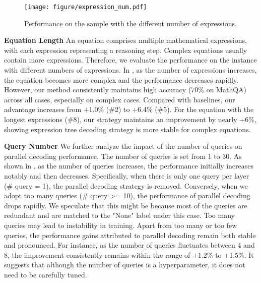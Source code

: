 \documentclass[11pt]{article}
\begin{document}
\begin{figure}[t] \centering \texttt{[image: figure/expression\_num.pdf]} \caption{Performance on the sample with the different number of expressions.} \label{expression_num} \end{figure}



\textbf{Equation Length} 
An equation comprises multiple mathematical expressions, with each expression representing a reasoning step. Complex equations usually contain more expressions. Therefore, we evaluate the performance on the instance with different numbers of expressions. In , as the number of expressions increases, the equation becomes more complex and the performance decreases rapidly. However, our method consistently maintains high accuracy (70\% on MathQA) across all cases, especially on complex cases. Compared with baselines, our advantage increases from +1.0\% (\#2) to +6.4\% (\#5). For the equation with the longest expressions (\#8), our strategy maintains an improvement by nearly +6\%, showing expression tree decoding strategy is more stable for complex equations.

\textbf{Query Number} 
We further analyze the impact of the number of queries on parallel decoding performance. The number of queries is set from 1 to 30. As shown in , as the number of queries increases, the performance initially increases notably and then decreases. Specifically, when there is only one query per layer (\# query = 1), the parallel decoding strategy is removed. Conversely, when we adopt too many queries (\# query >= 10), the performance of parallel decoding drops rapidly. We speculate that this might be because most of the queries are redundant and are matched to the "None" label under this case. Too many queries may lead to instability in training. Apart from too many or too few queries, the performance gains attributed to parallel decoding remain both stable and pronounced. For instance, as the number of queries fluctuates between 4 and 8, the improvement consistently remains within the range of +1.2\% to +1.5\%. It suggests that although the number of queries is a hyperparameter, it does not need to be carefully tuned.
\end{document}
